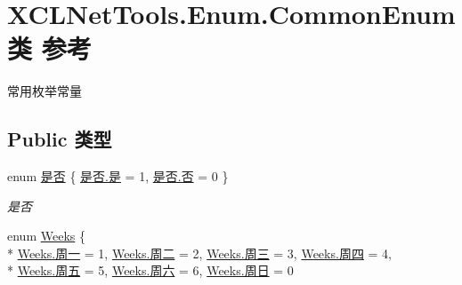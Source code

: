 \hypertarget{class_x_c_l_net_tools_1_1_enum_1_1_common_enum}{\section{X\-C\-L\-Net\-Tools.\-Enum.\-Common\-Enum类 参考}
\label{class_x_c_l_net_tools_1_1_enum_1_1_common_enum}
}


常用枚举常量  


\subsection*{Public 类型}
\begin{DoxyCompactItemize}
\item 
enum \hyperlink{class_x_c_l_net_tools_1_1_enum_1_1_common_enum_a5940e298dc09411c8a238f4f4e94e633}{是否} \{ \hyperlink{class_x_c_l_net_tools_1_1_enum_1_1_common_enum_a5940e298dc09411c8a238f4f4e94e633a0a60ac8f02ccd2cf723f927284877851}{是否.\-是} = 1, 
\hyperlink{class_x_c_l_net_tools_1_1_enum_1_1_common_enum_a5940e298dc09411c8a238f4f4e94e633ac9744f45e76d885ae1c74d4f4a934b2e}{是否.\-否} = 0
 \}
\begin{DoxyCompactList}\small\item\em 是否 \end{DoxyCompactList}\item 
enum \hyperlink{class_x_c_l_net_tools_1_1_enum_1_1_common_enum_adeccaeb33560c30593da561d8d0fe8de}{Weeks} \{ \\*
\hyperlink{class_x_c_l_net_tools_1_1_enum_1_1_common_enum_adeccaeb33560c30593da561d8d0fe8dea1603b069c2acf27a87ce160aa3b01336}{Weeks.\-周一} = 1, 
\hyperlink{class_x_c_l_net_tools_1_1_enum_1_1_common_enum_adeccaeb33560c30593da561d8d0fe8deab5a6a07e48ecd1e7be525c75c7adc56b}{Weeks.\-周二} = 2, 
\hyperlink{class_x_c_l_net_tools_1_1_enum_1_1_common_enum_adeccaeb33560c30593da561d8d0fe8deae60725e762551a706d64f9c9ec55aef2}{Weeks.\-周三} = 3, 
\hyperlink{class_x_c_l_net_tools_1_1_enum_1_1_common_enum_adeccaeb33560c30593da561d8d0fe8dea170fc8e27c08f11a440bfb1cbd6cc6fd}{Weeks.\-周四} = 4, 
\\*
\hyperlink{class_x_c_l_net_tools_1_1_enum_1_1_common_enum_adeccaeb33560c30593da561d8d0fe8deaeb79cea638b82f33d30ed5600f040d4b}{Weeks.\-周五} = 5, 
\hyperlink{class_x_c_l_net_tools_1_1_enum_1_1_common_enum_adeccaeb33560c30593da561d8d0fe8dea2457513054904ecee1cf282304c39e32}{Weeks.\-周六} = 6, 
\hyperlink{class_x_c_l_net_tools_1_1_enum_1_1_common_enum_adeccaeb33560c30593da561d8d0fe8dea562d7476abdbf97e2d5bdb25cd2b9ceb}{Weeks.\-周日} = 0

\end{DoxyCompactItemize}
